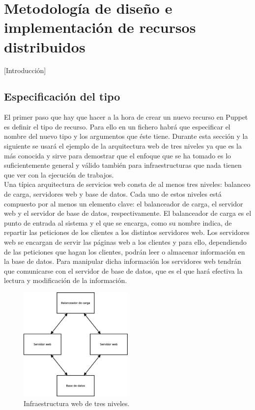 \chapter{Metodología de diseño e implementación de recursos distribuidos}
\label{cap:metodologia}

[Introducción]

\section{Especificación del tipo}

El primer paso que hay que hacer a la hora de crear un nuevo recurso en Puppet es definir el tipo de recurso. Para ello en un fichero habrá que especificar el nombre del nuevo tipo y los argumentos que éste tiene. Durante esta sección y la siguiente se usará el ejemplo de la arquitectura web de tres niveles ya que es la más conocida y sirve para demostrar que el enfoque que se ha tomado es lo suficientemente general y válido también para infraestructuras que nada tienen que ver con la ejecución de trabajos. \\

Una típica arquitectura de servicios web consta de al menos tres niveles: balanceo de carga, servidores web y base de datos. Cada uno de estos niveles está compuesto por al menos un elemento clave: el balanceador de carga, el servidor web y el servidor de base de datos, respectivamente. El balanceador de carga es el punto de entrada al sistema y el que se encarga, como su nombre indica, de repartir las peticiones de los clientes a los distintos servidores web. Los servidores web se encargan de servir las páginas web a los clientes y para ello, dependiendo de las peticiones que hagan los clientes, podrán leer o almacenar información en la base de datos. Para manipular dicha información los servidores web tendrán que comunicarse con el servidor de base de datos, que es el que hará efectiva la lectura y modificación de la información.\\

\begin{figure} [!htbp]
  \centering
  \includegraphics[width=0.5\textwidth]{figuras/Arquitectura_Web2.eps}
  \caption{Infraestructura web de tres niveles.}
\label{figure:arquitectura-web}
\end{figure}

